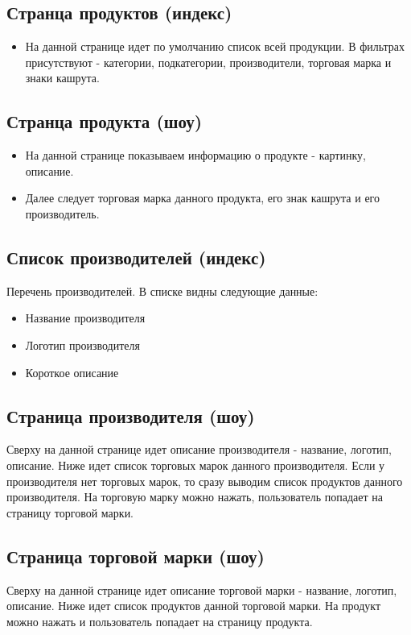 \documentclass[DIV=calc, paper=a4, fontsize=11pt]{scrartcl} %
\begin{document}
\subsection{Странца продуктов (индекс)}
\begin{itemize}
	\item На данной странице идет по умолчанию список всей продукции. В фильтрах присутствуют - категории, подкатегории, производители, торговая марка и знаки кашрута.
\end{itemize}

\subsection{Странца продукта (шоу)}
\begin{itemize}
	\item На данной странице показываем информацию о продукте - картинку, описание.
	\item Далее следует торговая марка данного продукта, его знак кашрута и его производитель. 
\end{itemize}

\subsection{Список производителей (индекс)}
Перечень производителей. В списке видны следующие данные:
\begin{itemize}
	\item Название производителя
	\item Логотип производителя
	\item Короткое описание
\end{itemize}

\subsection{Страница производителя (шоу)}
Сверху на данной странице идет описание производителя - название, логотип, описание. Ниже идет список торговых марок данного производителя. Если у производителя нет торговых марок, то сразу выводим список продуктов данного производителя. На торговую марку можно нажать, пользователь попадает на страницу торговой марки.

\subsection{Страница торговой марки (шоу)}
Сверху на данной странице идет описание торговой марки - название, логотип, описание. Ниже идет список продуктов данной торговой марки. На продукт можно нажать и пользователь попадает на страницу продукта.
\end{document}
